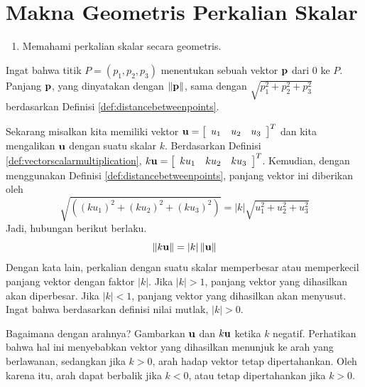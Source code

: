 \section{Makna Geometris Perkalian Skalar}

\begin{outcome}

\begin{enumerate}

\item[A.] Memahami perkalian skalar secara geometris.

\end{enumerate}
\end{outcome}

Ingat bahwa titik $P=\left( p_{1},p_{2},p_{3}\right) $ menentukan
sebuah vektor $\mathbf{p}$ dari $0$ ke $P$. Panjang $\mathbf{p}$, yang dinyatakan dengan $\|
\mathbf{p} \| $, sama dengan $
\sqrt{p_{1}^{2}+p_{2}^{2}+p_{3}^{2}}$ berdasarkan Definisi \ref{def:distancebetweenpoints}.

Sekarang misalkan kita memiliki vektor $\mathbf{u} = \left[
\begin{array}{lll}
u_1 &  u_2 & u_3
\end{array}
\right]^T$ dan kita mengalikan $\mathbf{u}$ dengan suatu
skalar $k$. Berdasarkan Definisi \ref{def:vectorscalarmultiplication},
$k\mathbf{u} = \left[
\begin{array}{rrr}
ku_{1} & ku_{2} & ku_{3}
\end{array}
\right]^T $.
Kemudian, dengan menggunakan Definisi \ref{def:distancebetweenpoints}, panjang vektor ini diberikan oleh
\begin{equation*}
\sqrt{\left( \left( k u_{1}\right) ^{2}+\left( k u_{2}\right)
^{2}+\left( k u_{3}\right) ^{2}\right) }=\left\vert k \right\vert
\sqrt{u_{1}^{2}+u_{2}^{2}+u_{3}^{2}}
\end{equation*}
Jadi, hubungan berikut berlaku.
\begin{equation*}
\| k \mathbf{u} \| =\left\vert k \right\vert
\| \mathbf{u} \|
\end{equation*}
Dengan kata lain, perkalian dengan suatu skalar memperbesar atau memperkecil panjang
vektor dengan faktor $\left\vert k \right\vert$. Jika $\left\vert k \right\vert > 1$, panjang vektor yang dihasilkan akan
diperbesar. Jika $\left\vert k \right\vert <1$, panjang vektor yang dihasilkan akan menyusut. Ingat bahwa berdasarkan definisi
nilai mutlak, $\left\vert k \right\vert >0$.

Bagaimana dengan arahnya? Gambarkan $\mathbf{u}$ dan $k\mathbf{u}$
ketika $k$ negatif. Perhatikan bahwa hal ini menyebabkan vektor yang dihasilkan
menunjuk ke arah yang berlawanan, sedangkan jika $k >0$, arah hadap
vektor tetap dipertahankan. Oleh karena itu, arah dapat berbalik
jika $k < 0$, atau tetap dipertahankan jika $k > 0$.

